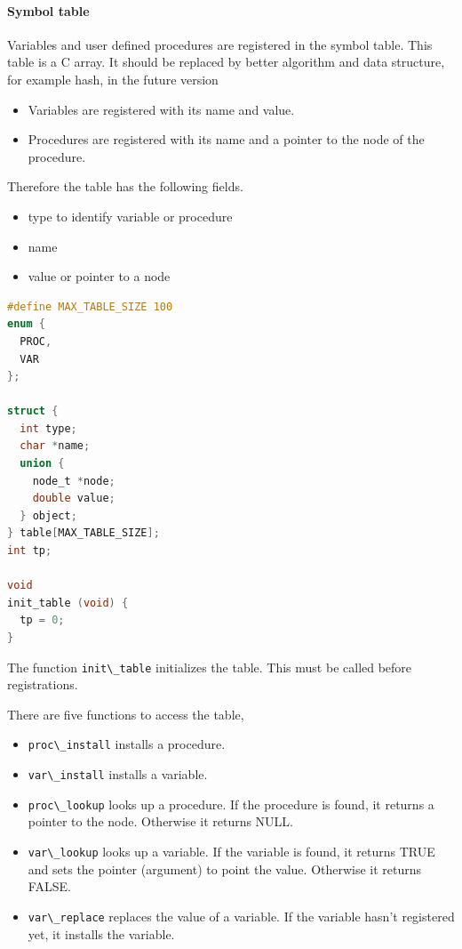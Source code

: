 \paragraph{Symbol table}\label{symbol-table}

Variables and user defined procedures are registered in the symbol
table. This table is a C array. It should be replaced by better
algorithm and data structure, for example hash, in the future version

\begin{itemize}
\tightlist
\item
  Variables are registered with its name and value.
\item
  Procedures are registered with its name and a pointer to the node of
  the procedure.
\end{itemize}

Therefore the table has the following fields.

\begin{itemize}
\tightlist
\item
  type to identify variable or procedure
\item
  name
\item
  value or pointer to a node
\end{itemize}

\begin{lstlisting}[language=C]
#define MAX_TABLE_SIZE 100
enum {
  PROC,
  VAR
};

struct {
  int type;
  char *name;
  union {
    node_t *node;
    double value;
  } object;
} table[MAX_TABLE_SIZE];
int tp;

void
init_table (void) {
  tp = 0;
}
\end{lstlisting}

The function \passthrough{\lstinline!init\_table!} initializes the
table. This must be called before registrations.

There are five functions to access the table,

\begin{itemize}
\tightlist
\item
  \passthrough{\lstinline!proc\_install!} installs a procedure.
\item
  \passthrough{\lstinline!var\_install!} installs a variable.
\item
  \passthrough{\lstinline!proc\_lookup!} looks up a procedure. If the
  procedure is found, it returns a pointer to the node. Otherwise it
  returns NULL.
\item
  \passthrough{\lstinline!var\_lookup!} looks up a variable. If the
  variable is found, it returns TRUE and sets the pointer (argument) to
  point the value. Otherwise it returns FALSE.
\item
  \passthrough{\lstinline!var\_replace!} replaces the value of a
  variable. If the variable hasn't registered yet, it installs the
  variable.
\end{itemize}

